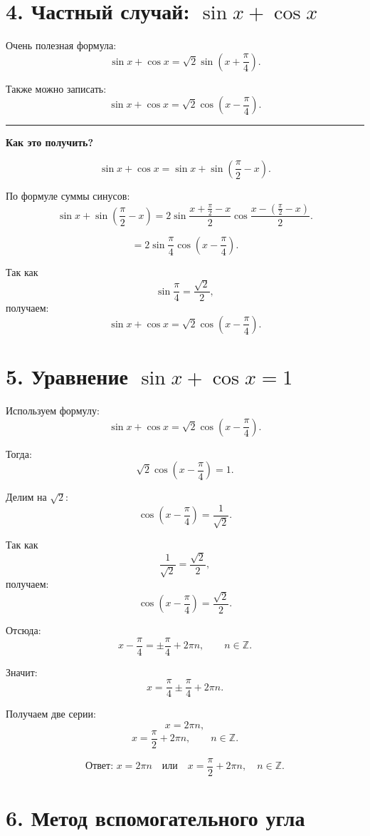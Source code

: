 \documentclass[a4paper,12pt]{article}
\newcommand{\sectionline}{%
\vspace{1mm}
\noindent\textcolor{lightline}{\rule{\linewidth}{0.8pt}}
\vspace{1mm}
}
\newcommand{\answer}[1]{\textbf{Ответ: }#1}
\begin{document}
\section*{4. Частный случай: \(\sin x+\cos x\)}

Очень полезная формула:
\[
\sin x+\cos x
=
\sqrt2\sin\left(x+\frac{\pi}{4}\right).
\]

Также можно записать:
\[
\sin x+\cos x
=
\sqrt2\cos\left(x-\frac{\pi}{4}\right).
\]

\sectionline

\textbf{Как это получить?}

\[
\sin x+\cos x
=
\sin x+\sin\left(\frac{\pi}{2}-x\right).
\]

По формуле суммы синусов:
\[
\sin x+\sin\left(\frac{\pi}{2}-x\right)
=
2\sin\frac{x+\frac{\pi}{2}-x}{2}
\cos\frac{x-\left(\frac{\pi}{2}-x\right)}{2}.
\]

\[
=
2\sin\frac{\pi}{4}\cos\left(x-\frac{\pi}{4}\right).
\]

Так как
\[
\sin\frac{\pi}{4}=\frac{\sqrt2}{2},
\]
получаем:
\[
\sin x+\cos x
=
\sqrt2\cos\left(x-\frac{\pi}{4}\right).
\]

\section*{5. Уравнение \(\sin x+\cos x=1\)}

Используем формулу:
\[
\sin x+\cos x
=
\sqrt2\cos\left(x-\frac{\pi}{4}\right).
\]

Тогда:
\[
\sqrt2\cos\left(x-\frac{\pi}{4}\right)=1.
\]

Делим на \(\sqrt2\):
\[
\cos\left(x-\frac{\pi}{4}\right)=\frac{1}{\sqrt2}.
\]

Так как
\[
\frac{1}{\sqrt2}=\frac{\sqrt2}{2},
\]
получаем:
\[
\cos\left(x-\frac{\pi}{4}\right)=\frac{\sqrt2}{2}.
\]

Отсюда:
\[
x-\frac{\pi}{4}=\pm\frac{\pi}{4}+2\pi n,\qquad n\in\mathbb Z.
\]

Значит:
\[
x=\frac{\pi}{4}\pm\frac{\pi}{4}+2\pi n.
\]

Получаем две серии:
\[
x=2\pi n,
\]
\[
x=\frac{\pi}{2}+2\pi n,
\qquad n\in\mathbb Z.
\]

\[
\answer{\displaystyle x=2\pi n \quad \text{или} \quad x=\frac{\pi}{2}+2\pi n,\quad n\in\mathbb Z.}
\]

\section*{6. Метод вспомогательного угла}
\end{document}
